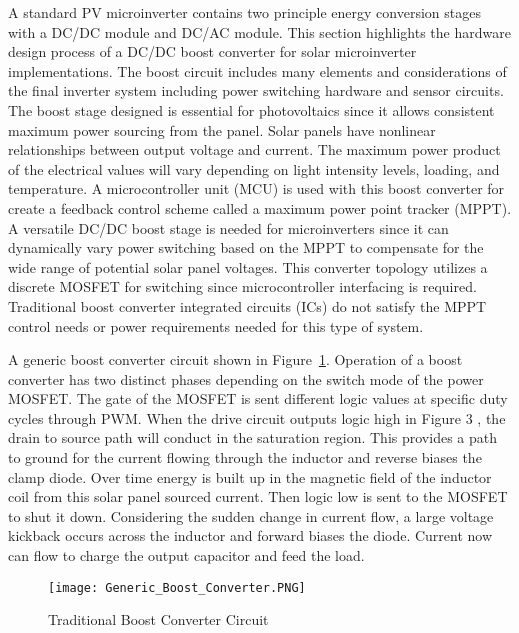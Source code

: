 A standard PV microinverter contains two principle energy conversion stages with a DC/DC module and DC/AC module. This section highlights the hardware design process of a DC/DC boost converter for solar microinverter implementations. The boost circuit includes many elements and considerations of the final inverter system including power switching hardware and sensor circuits. The boost stage designed is essential for photovoltaics since it allows consistent maximum power sourcing from the panel. Solar panels have nonlinear relationships between output voltage and current. The maximum power product of the electrical values will vary depending on light intensity levels, loading, and temperature. A microcontroller unit (MCU) is used with this boost converter for create a feedback control scheme called a maximum power point tracker (MPPT). A versatile DC/DC boost stage is needed for microinverters since it can dynamically vary power switching based on the MPPT to compensate for the wide range of potential solar panel voltages. This converter topology utilizes a discrete MOSFET for switching since microcontroller interfacing is required. Traditional boost converter integrated circuits (ICs) do not satisfy the MPPT control needs or power requirements needed for this type of system.  

A generic boost converter circuit shown in Figure~\ref{Figure 3}. Operation of a boost converter has two distinct phases depending on the switch mode of the power MOSFET. The gate of the MOSFET is sent different logic values at specific duty cycles through PWM. When the drive circuit outputs logic high in Figure 3 , the drain to source path will conduct in the saturation region. This provides a path to ground for the current flowing through the inductor and reverse biases the clamp diode. Over time energy is built up in the magnetic field of the inductor coil from this solar panel sourced current. Then logic low is sent to the MOSFET to shut it down. Considering the sudden change in current flow, a large voltage kickback occurs across the inductor and forward biases the diode. Current now can flow to charge the output capacitor and feed the load.

\begin{figure}
\centering
\texttt{[image: Generic\_Boost\_Converter.PNG]}
\caption{Traditional Boost Converter Circuit}
\label{Figure 3}
\end{figure}


